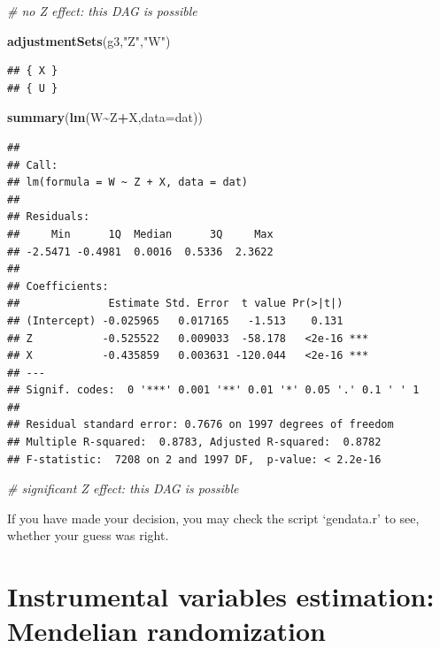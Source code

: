 \documentclass[
]{book}
\newenvironment{Shaded}{\begin{snugshade}}{\end{snugshade}}
\newcommand{\AttributeTok}[1]{\textcolor[rgb]{0.13,0.29,0.53}{#1}}
\newcommand{\CommentTok}[1]{\textcolor[rgb]{0.56,0.35,0.01}{\textit{#1}}}
\newcommand{\FunctionTok}[1]{\textcolor[rgb]{0.13,0.29,0.53}{\textbf{#1}}}
\newcommand{\NormalTok}[1]{#1}
\newcommand{\SpecialCharTok}[1]{\textcolor[rgb]{0.81,0.36,0.00}{\textbf{#1}}}
\newcommand{\StringTok}[1]{\textcolor[rgb]{0.31,0.60,0.02}{#1}}
\begin{document}
\begin{Shaded}
\begin{Highlighting}[]
\CommentTok{\# no Z effect: this DAG is possible}

\FunctionTok{adjustmentSets}\NormalTok{(g3,}\StringTok{"Z"}\NormalTok{,}\StringTok{"W"}\NormalTok{)}
\end{Highlighting}
\end{Shaded}

\begin{verbatim}
## { X }
## { U }
\end{verbatim}

\begin{Shaded}
\begin{Highlighting}[]
\FunctionTok{summary}\NormalTok{(}\FunctionTok{lm}\NormalTok{(W}\SpecialCharTok{\textasciitilde{}}\NormalTok{Z}\SpecialCharTok{+}\NormalTok{X,}\AttributeTok{data=}\NormalTok{dat))}
\end{Highlighting}
\end{Shaded}

\begin{verbatim}
## 
## Call:
## lm(formula = W ~ Z + X, data = dat)
## 
## Residuals:
##     Min      1Q  Median      3Q     Max 
## -2.5471 -0.4981  0.0016  0.5336  2.3622 
## 
## Coefficients:
##              Estimate Std. Error  t value Pr(>|t|)    
## (Intercept) -0.025965   0.017165   -1.513    0.131    
## Z           -0.525522   0.009033  -58.178   <2e-16 ***
## X           -0.435859   0.003631 -120.044   <2e-16 ***
## ---
## Signif. codes:  0 '***' 0.001 '**' 0.01 '*' 0.05 '.' 0.1 ' ' 1
## 
## Residual standard error: 0.7676 on 1997 degrees of freedom
## Multiple R-squared:  0.8783, Adjusted R-squared:  0.8782 
## F-statistic:  7208 on 2 and 1997 DF,  p-value: < 2.2e-16
\end{verbatim}

\begin{Shaded}
\begin{Highlighting}[]
\CommentTok{\# significant Z effect: this DAG is possible}
\end{Highlighting}
\end{Shaded}

If you have made your decision, you may check the script `gendata.r' to see, whether your guess was right.

\section{Instrumental variables estimation: Mendelian randomization}\label{instrumental-variables-estimation-mendelian-randomization}
\end{document}
